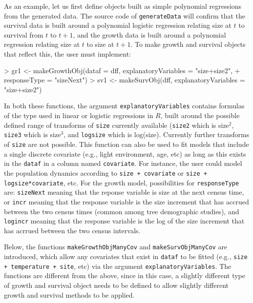\documentclass{article}
\begin{document}
As an example, let us first define objects built as simple polynomial regressions from the generated data. The source code of {\tt generateData} will confirm that the survival data is built around a polynomial logistic regression relating size at $t$ to survival from $t$ to $t+1$, and the growth data is built around a polynomial regression relating size at $t$ to size at $t+1$. To make growth and survival objects that reflect this, the user must implement:  
\begin{Schunk}
\begin{Sinput}
> gr1 <- makeGrowthObj(dataf = dff, explanatoryVariables = "size+size2", 
+ 		   responseType = "sizeNext")
> sv1 <- makeSurvObj(dff, explanatoryVariables = "size+size2")
\end{Sinput}
\end{Schunk}
In both these functions, the argument {\tt explanatoryVariables} contains formulas of the type used in linear or logistic regressions in $R$, built around the possible defined range of transforms of  {\tt size} currently available ({\tt size2} which is size$^2$, {\tt size3} which is size$^3$, and {\tt logsize} which is log(size). Currently further transforms of  {\tt size} are not possible. This function can also be used to fit models that include a single discrete covariate (e.g., light environment, age, etc) as long as this exists in the {\tt dataf} in a column named {\tt covariate}. For instance, the user could model the population dynamics according to  {\tt size + covariate} or  {\tt size + logsize*covariate}, etc. For the growth model, possibilities for {\tt responseType} are: {\tt sizeNext} meaning that the reponse variable is size at the next census time, or {\tt incr} meaning that the response variable is the size increment that has accrued between the two census times (common among tree demographic studies), and {\tt logincr} meaning that the response variable is the log of the size increment that has acrrued between the two census intervals.

Below, the functions {\tt makeGrowthObjManyCov} and {\tt makeSurvObjManyCov} are introduced, which allow any covariates that exist in {\tt dataf} to be fitted (e.g., {\tt size + temperature + site}, etc) via the argument {\tt explanatoryVariables}. The functions are different from the above, since in this case, a slightly different type of growth and survival object needs to be defined to allow slightly different growth and survival methods to be applied. 
\end{document}

